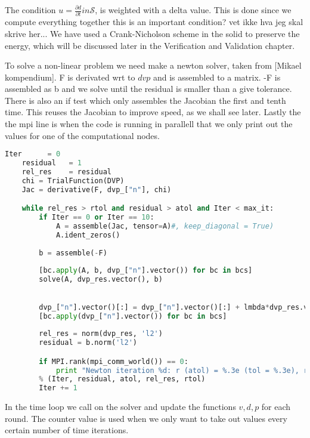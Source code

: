 The condition $ u = \frac{\partial d}{\partial t} in \mathcal{S} $, is weighted with a delta value. This is done since we compute everything together this is an important condition? vet ikke hva jeg skal skrive her...
We have used a Crank-Nicholson scheme in the solid to preserve the energy, which will be discussed later in the Verification and Validation chapter.

To solve a non-linear problem we need make a newton solver, taken from [Mikael kompendium]. F is derivated wrt to $dvp$ and is assembled to a matrix. -F is assembled as b and we solve until the residual is smaller than a give tolerance. There is also an if test which only assembles the Jacobian the first and tenth time. This reuses the Jacobian to improve speed, as we shall see later. Lastly the the mpi line is when the code is running in parallell that we only print out the values for one of the computational nodes.  
\begin{lstlisting}[language=Python]
    Iter      = 0
    residual   = 1
    rel_res    = residual
    chi = TrialFunction(DVP)
    Jac = derivative(F, dvp_["n"], chi)

    while rel_res > rtol and residual > atol and Iter < max_it:
        if Iter == 0 or Iter == 10:
            A = assemble(Jac, tensor=A)#, keep_diagonal = True)
            A.ident_zeros()
            
        b = assemble(-F)
        
        [bc.apply(A, b, dvp_["n"].vector()) for bc in bcs]
        solve(A, dvp_res.vector(), b)
                   

        dvp_["n"].vector()[:] = dvp_["n"].vector()[:] + lmbda*dvp_res.vector()[:]
        [bc.apply(dvp_["n"].vector()) for bc in bcs]
        
        rel_res = norm(dvp_res, 'l2')
        residual = b.norm('l2')

        if MPI.rank(mpi_comm_world()) == 0:
            print "Newton iteration %d: r (atol) = %.3e (tol = %.3e), r (rel) = %.3e (tol = %.3e) " \
        % (Iter, residual, atol, rel_res, rtol)
        Iter += 1
\end{lstlisting}


In the time loop we call on the solver and update the functions $ v,d,p$ for each round. The counter value is used when we only want to take out values every certain number of time iterations.

